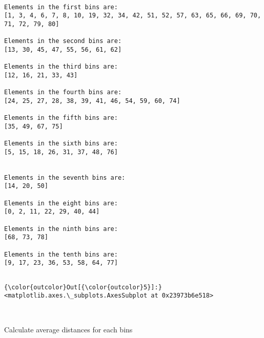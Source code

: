 \documentclass[11pt]{article}
\begin{document}
    \begin{Verbatim}[commandchars=\\\{\}]

Elements in the first bins are: 
[1, 3, 4, 6, 7, 8, 10, 19, 32, 34, 42, 51, 52, 57, 63, 65, 66, 69, 70, 71, 72, 79, 80]

Elements in the second bins are: 
[13, 30, 45, 47, 55, 56, 61, 62]

Elements in the third bins are: 
[12, 16, 21, 33, 43]

Elements in the fourth bins are: 
[24, 25, 27, 28, 38, 39, 41, 46, 54, 59, 60, 74]

Elements in the fifth bins are: 
[35, 49, 67, 75]

Elements in the sixth bins are: 
[5, 15, 18, 26, 31, 37, 48, 76]


Elements in the seventh bins are: 
[14, 20, 50]

Elements in the eight bins are: 
[0, 2, 11, 22, 29, 40, 44]

Elements in the ninth bins are: 
[68, 73, 78]

Elements in the tenth bins are: 
[9, 17, 23, 36, 53, 58, 64, 77]


    \end{Verbatim}

\begin{Verbatim}[commandchars=\\\{\}]
{\color{outcolor}Out[{\color{outcolor}5}]:} <matplotlib.axes.\_subplots.AxesSubplot at 0x23973b6e518>
\end{Verbatim}
            
    \begin{center}
    \end{center}
    { \hspace*{\fill} \\}
    
    Calculate average distances for each bins
\end{document}
